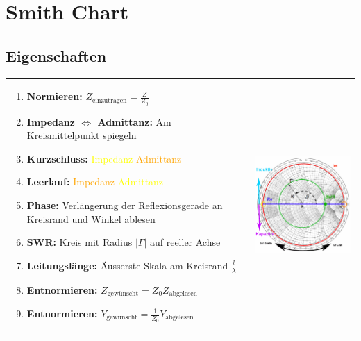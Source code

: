 
\section{Smith Chart}
\subsection{Eigenschaften}
	\begin{tabular}{p{10cm}p{8cm}}
		\begin{minipage}{10cm}
        	\begin{enumerate}{\setlength{\itemsep}{0cm}\setlength{\parsep}{0cm} \setlength{\topsep}{0cm}}
              \item \textbf{Normieren:} $Z_{\text{einzutragen}} = \frac{Z}{Z_0}$
              \item \textbf{Impedanz $\Leftrightarrow$ Admittanz:} Am Kreismittelpunkt spiegeln
              \item \textbf{Kurzschluss:} 	\textcolor{yellow}{Impedanz} \textcolor{orange}{Admittanz}
              \item \textbf{Leerlauf:}		\textcolor{orange}{Impedanz} \textcolor{yellow}{Admittanz}
        	  \item \textbf{Phase:}	Verlängerung der Reflexionsgerade an Kreisrand und Winkel ablesen
        	  \item \textbf{SWR:} Kreis mit Radius $|\Gamma|$ auf reeller Achse
        	  \item \textbf{Leitungslänge:} Äusserste Skala am Kreisrand  $\frac{l}{\lambda}$
        	  \item \textbf{Entnormieren:} $Z_{\text{gewünscht}} = Z_0
        	  Z_{\text{abgelesen}}$
        	  \item \textbf{Entnormieren:} $Y_{\text{gewünscht}} = \frac{1}{Z_0}
        	  Y_{\text{abgelesen}}$
            \end{enumerate}
            
        \end{minipage} &
		\begin{minipage}{8cm}
        	\includegraphics[height=7cm]{./bilder/SmithChart2.png}
        \end{minipage}
	\end{tabular}
